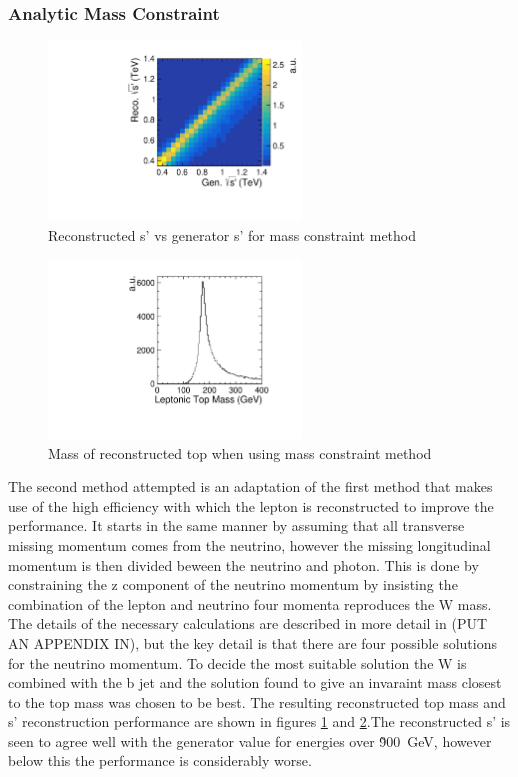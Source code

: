 \subsubsection{Analytic Mass Constraint}

\begin{figure}
  \centering
  \includegraphics[width=0.6\textwidth]{TopAnalysis/figures/AnalEVsTrueE.pdf}
  \caption[Reconstructed s' vs generator s' for mass constraint method]{Reconstructed s' vs generator s' for mass constraint method}
  \label{fig:MassConstraint}
\end{figure}

\begin{figure}
  \centering
  \includegraphics[width=0.6\textwidth]{TopAnalysis/figures/AnalTopMass.pdf}
  \caption[Mass of reconstructed top when using mass constraint method]{Mass of reconstructed top when using mass constraint method}
  \label{fig:TopMassFrommassMethod}
\end{figure}

The second method attempted is an adaptation of the first method that makes use of the high efficiency with which the lepton is reconstructed to improve the performance. It starts in the same manner by assuming that all transverse missing momentum comes from the neutrino, however the missing longitudinal momentum is then divided beween the neutrino and photon. This is done by constraining the z component of the neutrino momentum by insisting the combination of the lepton and neutrino four momenta reproduces the W mass. The details of the necessary calculations are described in more detail in (PUT AN APPENDIX IN), but the key detail is that there are four possible solutions for the neutrino momentum. To decide the most suitable solution the W is combined with the b jet and the solution found to give an invaraint mass closest to the top mass was chosen to be best. The resulting reconstructed top mass and s' reconstruction performance are shown in figures \ref{fig:MassConstraint} and \ref{fig:TopMassFrommassMethod}.The reconstructed s' is seen to agree well with the generator value for energies over \~900~GeV, however below this the performance is considerably worse.

